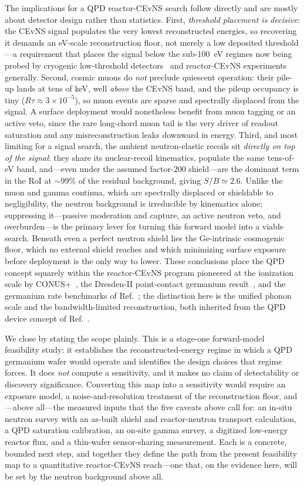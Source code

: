The implications for a QPD reactor-CEvNS search follow directly and are
mostly about detector design rather than statistics. First, \emph{threshold
placement is decisive}: the CEvNS signal populates the very lowest
reconstructed energies, so recovering it demands an eV-scale reconstruction
floor, not merely a low deposited threshold---a requirement that places the
signal below the sub-100~eV regimes now being probed by cryogenic
low-threshold detectors~\cite{nucleus} and reactor-CEvNS experiments
generally. Second, cosmic muons do \emph{not} preclude quiescent operation:
their pile-up lands at tens of keV, well \emph{above} the CEvNS band, and the
pileup occupancy is tiny ($R\tau\approx3\times10^{-5}$), so muon events are
sparse and spectrally displaced from the signal. A surface deployment would
nonetheless benefit from muon tagging or an active veto, since the rare
long-chord muon tail is the very driver of readout saturation and any
misreconstruction leaks downward in energy. Third, and most limiting for a
signal search, the ambient neutron-elastic recoils sit \emph{directly on top
of the signal}: they share its nuclear-recoil kinematics, populate the same
tens-of-eV band, and---even under the assumed factor-$200$ shield---are the
dominant term in the RoI at $\sim$99\% of the residual background, giving
$S/B\simeq2.6$. Unlike the muon and gamma continua, which are spectrally
displaced or shieldable to negligibility, the neutron background is
irreducible by kinematics alone; suppressing it---passive moderation and
capture, an active neutron veto, and overburden---is the primary lever for
turning this forward model into a viable search. Beneath even a perfect neutron shield
lies the Ge-intrinsic cosmogenic floor, which no external shield reaches and
which minimizing surface exposure before deployment is the only way to lower. These conclusions
place the QPD concept squarely within the reactor-CEvNS program pioneered at
the ionization scale by CONUS+~\cite{conus2025}, the Dresden-II point-contact
germanium result~\cite{dresden2022}, and the germanium rate benchmarks
of Ref.~\cite{billard2017}; the distinction here is the unified phonon scale
and the bandwidth-limited reconstruction, both inherited from the QPD device
concept of Ref.~\cite{ramanathan2026}.

We close by stating the scope plainly. This is a stage-one forward-model
feasibility study: it establishes the reconstructed-energy regime in which a
QPD germanium wafer would operate and identifies the design choices that
regime forces. It does \emph{not} compute a sensitivity, and it makes no
claim of detectability or discovery significance. Converting this map into a
sensitivity would require an exposure model, a noise-and-resolution
treatment of the reconstruction floor, and---above all---the measured inputs
that the five caveats above call for: an in-situ neutron survey with an
as-built shield and reactor-neutron transport calculation, a QPD saturation
calibration, an on-site gamma survey, a digitized low-energy reactor flux,
and a thin-wafer sensor-sharing measurement. Each is a concrete, bounded next
step, and together they define the path from the present feasibility map to a
quantitative reactor-CEvNS reach---one that, on the evidence here, will be set
by the neutron background above all.
